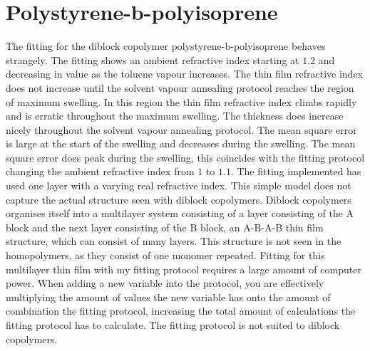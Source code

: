 \documentclass[MasterThesisMain.tex]{subfiles}
\begin{document}
\section{Polystyrene-b-polyisoprene}
The fitting for the diblock copolymer polystyrene-b-polyisoprene behaves strangely. The fitting shows an ambient refractive index starting at $1.2$ and decreasing in value as the toluene vapour increases. The thin film refractive index does not increase until the solvent vapour annealing protocol reaches the region of maximum swelling. In this region the thin film refractive index climbs rapidly and is erratic throughout the maximum swelling. The thickness does increase nicely throughout the solvent vapour annealing protocol. The mean square error is large at the start of the swelling and decreases during the swelling. The mean square error does peak during the swelling, this coincides with the fitting protocol changing the ambient refractive index from $1$ to $1.1$. The fitting implemented has used one layer with a varying real refractive index. This simple model does not capture the actual structure seen with diblock copolymers. Diblock copolymers organises itself into a multilayer system consisting of a layer consisting of the A block and the next layer consisting of the B block, an A-B-A-B thin film structure, which can consist of many layers. This structure is not seen in the homopolymers, as they consist of one monomer repeated. Fitting for this multilayer thin film with my fitting protocol requires a large amount of computer power. When adding a new variable into the protocol, you are effectively multiplying the amount of values the new variable has onto the amount of combination the fitting protocol, increasing the total amount of calculations the fitting protocol has to calculate. The fitting protocol is not suited to diblock copolymers.
\end{document}
